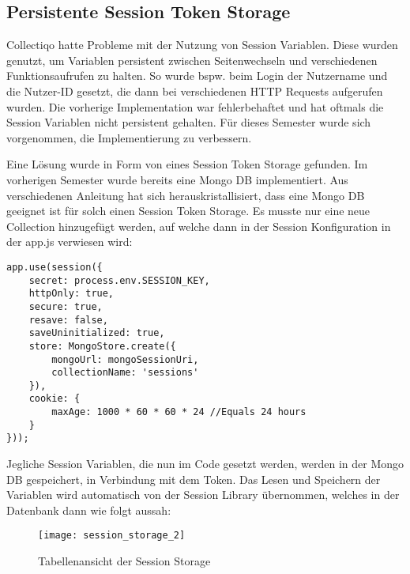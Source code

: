\subsection{Persistente Session Token Storage}\label{subsec:persistente-session-token-storage}
Collectiqo hatte Probleme mit der Nutzung von Session Variablen.
Diese wurden genutzt, um Variablen persistent zwischen Seitenwechseln und verschiedenen Funktionsaufrufen zu halten.
So wurde bspw. beim Login der Nutzername und die Nutzer-ID gesetzt, die dann bei verschiedenen HTTP Requests aufgerufen wurden.
Die vorherige Implementation war fehlerbehaftet und hat oftmals die Session Variablen nicht persistent gehalten.
Für dieses Semester wurde sich vorgenommen, die Implementierung zu verbessern.

Eine Lösung wurde in Form von eines Session Token Storage gefunden.
Im vorherigen Semester wurde bereits eine Mongo DB implementiert.
Aus verschiedenen Anleitung hat sich herauskristallisiert, dass eine Mongo DB geeignet ist für solch einen Session Token Storage.
Es musste nur eine neue Collection hinzugefügt werden, auf welche dann in der Session Konfiguration in der app.js verwiesen wird:

\vspace{1em}
\lstset{language=javascript}
\begin{lstlisting}[label={lst:sessions}]
app.use(session({
    secret: process.env.SESSION_KEY,
    httpOnly: true,
    secure: true,
    resave: false,
    saveUninitialized: true,
    store: MongoStore.create({
        mongoUrl: mongoSessionUri,
        collectionName: 'sessions'
    }),
    cookie: {
        maxAge: 1000 * 60 * 60 * 24 //Equals 24 hours
    }
}));
\end{lstlisting}
\vspace{1em}

Jegliche Session Variablen, die nun im Code gesetzt werden, werden in der Mongo DB gespeichert, in Verbindung mit dem Token.
Das Lesen und Speichern der Variablen wird automatisch von der Session Library übernommen, welches in der Datenbank dann wie folgt aussah:

\begin{figure}[h]
    \centering
    \texttt{[image: session\_storage\_2]}
    \caption{Tabellenansicht der Session Storage}
    \label{fig:session_storage_2}
\end{figure}